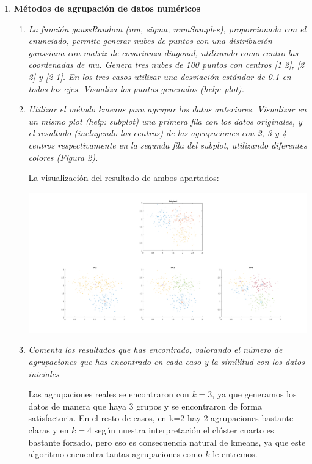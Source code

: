 \documentclass{article}
\begin{document}
\begin{enumerate}
\newpage

 \item \textbf{Métodos de agrupación de datos numéricos}

 \begin{enumerate}
 \item \textit{La función gaussRandom (mu, sigma, numSamples), proporcionada con el 
enunciado,  permite  generar  nubes  de  puntos  con  una  distribución 
gaussiana con matriz de covarianza diagonal, utilizando como centro las 
coordenadas de mu. Genera tres nubes de 100 puntos con centros [1 2], [2 
2]  y  [2  1].  En  los  tres  casos  utilizar  una desviación  estándar  de  0.1  en 
todos los ejes. Visualiza los puntos generados (help: plot).}

 \item \textit{Utilizar el método kmeans para agrupar los datos anteriores. Visualizar en 
un mismo plot (help: subplot) una primera fila con los datos originales, y 
el  resultado  (incluyendo  los  centros)  de  las  agrupaciones  con  2,  3  y  4 
centros  respectivamente  en  la  segunda  fila  del  subplot,  utilizando 
diferentes colores (Figura 2).}

	La visualización del resultado de ambos apartados:
	
	\begin{center}
		\includegraphics[width=\textwidth]{ej32-kmeans.png}
	\end{center}

 \item \textit{Comenta  los  resultados  que  has  encontrado,  valorando  el  número  de 
agrupaciones que has encontrado en cada caso y la similitud con los datos 
iniciales}
 
 Las agrupaciones reales se encontraron con $k=3$, ya que generamos los datos de manera que haya 3 grupos y se encontraron de forma satisfactoria. En el resto de casos, en k=2 hay 2 agrupaciones bastante claras y en $k=4$ según nuestra interpretación el clúster cuarto es bastante forzado, pero eso es consecuencia natural de kmeans, ya que este algoritmo encuentra tantas agrupaciones como $k$ le entremos.


\end{enumerate}
\end{enumerate}
\end{document}
